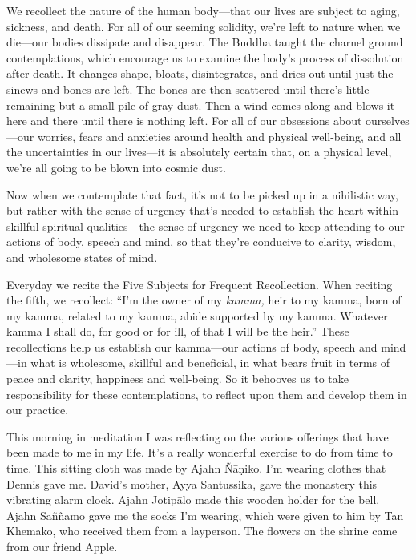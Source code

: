 We recollect the nature of the human body---that our lives are subject 
to aging, sickness, and death. For all of our seeming solidity, we're 
left to nature when we die---our bodies dissipate and disappear. The 
Buddha taught the charnel ground contemplations, which encourage us to 
examine the body's process of dissolution after death. It changes 
shape, bloats, disintegrates, and dries out until just the sinews and 
bones are left. The bones are then scattered until there's little 
remaining but a small pile of gray dust. Then a wind comes along and 
blows it here and there until there is nothing left. For all of our 
obsessions about ourselves---our worries, fears and anxieties around 
health and physical well-being, and all the uncertainties in our 
lives---it is absolutely certain that, on a physical level, we're all 
going to be blown into cosmic dust.

Now when we contemplate that fact, it's not to be picked up in a 
nihilistic way, but rather with the sense of urgency that's needed to 
establish the heart within skillful spiritual qualities---the sense of 
urgency we need to keep attending to our actions of body, speech and 
mind, so that they're conducive to clarity, wisdom, and wholesome 
states of mind.

Everyday we recite the Five Subjects for Frequent Recollection. When 
reciting the fifth, we recollect: ``I'm the owner of my \emph{kamma,} 
heir to my kamma, born of my kamma, related to my kamma, abide 
supported by my kamma. Whatever kamma I shall do, for good or for ill, 
of that I will be the heir.'' These recollections help us establish our 
kamma---our actions of body, speech and mind---in what is wholesome, 
skillful and beneficial, in what bears fruit in terms of peace and 
clarity, happiness and well-being. So it behooves us to take 
responsibility for these contemplations, to reflect upon them and 
develop them in our practice.


This morning in meditation I was reflecting on the various offerings 
that have been made to me in my life. It's a really wonderful exercise 
to do from time to time. This sitting cloth was made by Ajahn 
Ñāṇiko. I'm wearing clothes that Dennis gave me. David's mother, 
Ayya Santussika, gave the monastery this vibrating alarm clock. Ajahn 
Jotipālo made this wooden holder for the bell. Ajahn Saññamo gave me 
the socks I'm wearing, which were given to him by Tan Khemako, who 
received them from a layperson. The flowers on the shrine came from our 
friend Apple.

